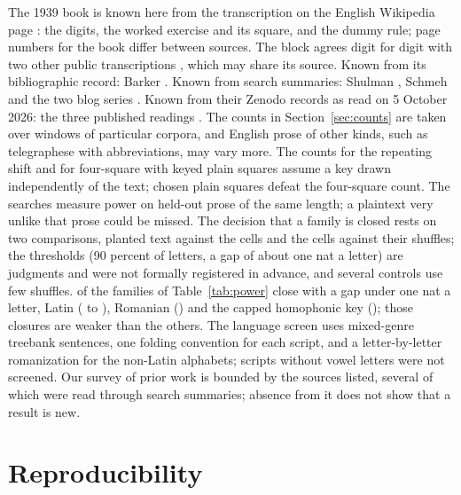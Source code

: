 \documentclass[11pt]{article}
\theoremstyle{definition}
\begin{document}
The 1939 book is known here from the transcription on the English Wikipedia page \cite{wikipedia2026}: the digits, the worked exercise and its square, and the dummy rule; page numbers for the book differ between sources. The block agrees digit for digit with two other public transcriptions \cite{ashley2026,snider2026}, which may share its source. Known from its bibliographic record: Barker \cite{barker1978}. Known from search summaries: Shulman \cite{shulman1952}, Schmeh \cite{schmeh2026mtc3} and the two blog series \cite{pleasedecipher2010,numberworld2015}. Known from their Zenodo records as read on 5 October 2026: the three published readings \cite{uygun2026,caillahua2026,leggett2025}. The counts in Section~\ref{sec:counts} are taken over windows of particular corpora, and English prose of other kinds, such as telegraphese with abbreviations, may vary more. The counts for the repeating shift and for four-square with keyed plain squares assume a key drawn independently of the text; chosen plain squares defeat the four-square count. The searches measure power on held-out prose of the same length; a plaintext very unlike that prose could be missed. The decision that a family is closed rests on two comparisons, planted text against the cells and the cells against their shuffles; the thresholds (90 percent of letters, a gap of about one nat a letter) are judgments and were not formally registered in advance, and several controls use few shuffles. \gapUnderOne{} of the \gapRows{} families of Table~\ref{tab:power} close with a gap under one nat a letter, Latin (\gapLatinLow{} to \gapLatinHigh{}), Romanian (\gapRomanianTab{}) and the capped homophonic key (\gapHomTab{}); those closures are weaker than the others. The language screen uses mixed-genre treebank sentences, one folding convention for each script, and a letter-by-letter romanization for the non-Latin alphabets; scripts without vowel letters were not screened. Our survey of prior work is bounded by the sources listed, several of which were read through search summaries; absence from it does not show that a result is new.

\section{Reproducibility}\label{sec:repro}
\end{document}
